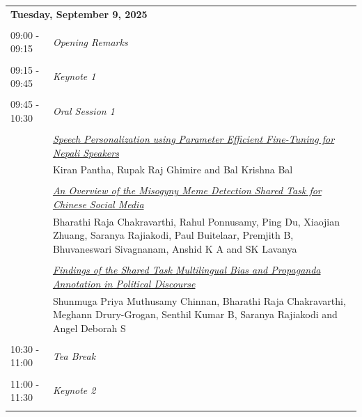 \documentclass[11pt,oneside]{book}
\begin{document}
    \begin{tabular}{p{24mm}p{124mm}}
    \multicolumn{2}{l}{\bf Tuesday, September 9, 2025 } \\\\
                  09:00 - 09:15 & \emph{Opening Remarks}\\\\
      
                        09:15 - 09:45 & \emph{Keynote 1}\\\\
      
                        09:45 - 10:30 & \emph{Oral Session 1}\\\\
      
                
                      & \hyperlink{page.189}{\emph{Speech Personalization using Parameter Efficient Fine-Tuning for Nepali Speakers}}\\
        & Kiran Pantha\index{Pantha}, Rupak Raj Ghimire\index{Ghimire} and Bal Krishna Bal\index{Bal}\\\\
                
                      & \hyperlink{page.199}{\emph{An Overview of the Misogyny Meme Detection Shared Task for Chinese Social Media}}\\
        & Bharathi Raja Chakravarthi\index{Chakravarthi}, Rahul Ponnusamy\index{Ponnusamy}, Ping Du\index{Du}, Xiaojian Zhuang\index{Zhuang}, Saranya Rajiakodi\index{Rajiakodi}, Paul Buitelaar\index{Buitelaar}, Premjith B\index{B}, Bhuvaneswari Sivagnanam\index{Sivagnanam}, Anshid K A\index{A} and SK Lavanya\index{Lavanya}\\\\
                
                      & \hyperlink{page.208}{\emph{Findings of the Shared Task Multilingual Bias and Propaganda Annotation in Political Discourse}}\\
        & Shunmuga Priya Muthusamy Chinnan\index{Chinnan}, Bharathi Raja Chakravarthi\index{Chakravarthi}, Meghann Drury-Grogan\index{Drury-Grogan}, Senthil Kumar B\index{B}, Saranya Rajiakodi\index{Rajiakodi} and Angel Deborah S\index{S}\\\\
                        10:30 - 11:00 & \emph{Tea Break}\\\\
      
                        11:00 - 11:30 & \emph{Keynote 2}\\\\
      

\end{tabular}
\end{document}
